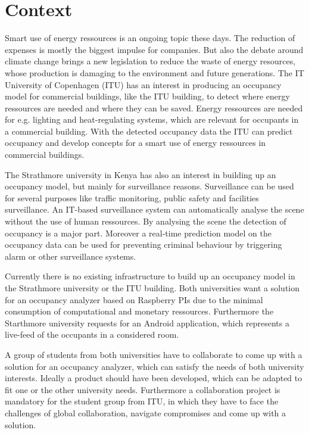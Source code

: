 \section{Context}


Smart use of energy ressources is an ongoing topic these days. The reduction of expenses is mostly the biggest impulse for companies. But also the debate around climate change brings a new legislation to reduce the waste of energy resources, whose production is damaging to the environment and future generations. The IT University of Copenhagen (ITU) has an interest in producing an occupancy model for commercial buildings, like the ITU building, to detect where energy ressources are needed and where they can be saved. Energy ressources are needed for e.g. lighting and heat-regulating systems, which are relevant for occupants in a commercial building. With the detected occupancy data the ITU can predict occupancy and develop concepts for a smart use of energy ressources in commercial buildings.

The Strathmore university in Kenya has also an interest in building up an occupancy model, but mainly for surveillance reasons. Surveillance can be used for several purposes like traffic monitoring, public safety and facilities surveillance. An IT-based surveillance system can automatically analyse the scene without the use of human ressources. By analysing the scene the detection of occupancy is a major part. Moreover a real-time prediction model on the occupancy data can be used for preventing criminal behaviour by triggering alarm or other surveillance systems.

Currently there is no existing infrastructure to build up an occupancy model in the Strathmore university or the ITU building. Both universities want a solution for an occupancy analyzer based on Raspberry PIs due to the minimal consumption of computational and monetary ressources. Furthermore the Starthmore university requests for an Android application, which represents a live-feed of the occupants in a considered room.

A group of students from both universities have to collaborate to come up with a solution for an occupancy analyzer, which can satisfy the needs of both university interests. Ideally a product should have been developed, which can be adapted to fit one or the other university needs.
Furthermore a collaboration project is mandatory for the student group from ITU, in which they have to face the challenges of global collaboration, navigate compromises and come up with a solution.

